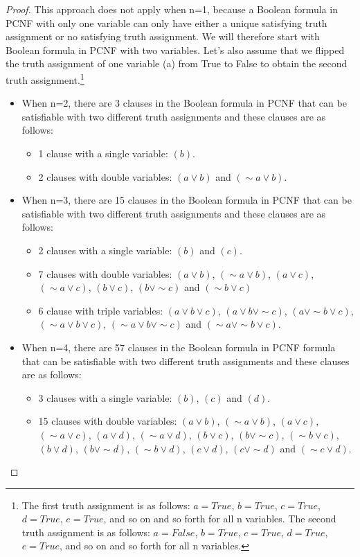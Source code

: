 \documentclass[runningheads,a4paper]{llncs}
\let\oldsim\sim
\renewcommand{\sim}{{\oldsim}}
\begin{document}
\begin{theorem}
\begin{proof}
This approach does not apply when n=1, because a Boolean formula in PCNF with only one variable can only have either a unique satisfying truth assignment or no satisfying truth assignment. We will therefore start with Boolean formula in PCNF with two variables. Let's also assume that we flipped the truth assignment of one variable (a) from True to False to obtain the second truth assignment.\footnote{The first truth assignment is as follows: $a=True$, $b=True$, $c=True$, $d=True$, $e=True$, and so on and so forth for all n variables. The second truth assignment is as follows: $a=False$, $b=True$, $c=True$, $d=True$, $e=True$, and so on and so forth for all n variables. } 
\begin{itemize}
\item When n=2, there are 3 clauses in the Boolean formula in PCNF that can be satisfiable with two different truth assignments  and these clauses are as follows:
    \begin{itemize}
    \item 1 clause with a single variable: $(b)$.
    \item 2 clauses with double variables: $({a}\vee {b})$ and $(\sim {a}\vee {b})$.
    \end{itemize}
\item When n=3, there are 15 clauses in the Boolean formula in PCNF that can be satisfiable with two different truth assignments and these clauses are as follows:
    \begin{itemize}
    \item 2 clauses with a single variable:  $(b)$ and $(c)$.
    \item 7 clauses with double variables: $({a}\vee {b})$,  $(\sim {a}\vee {b})$,  $({a}\vee {c})$, $(\sim {a}\vee {c})$,  $({b}\vee {c})$, $({b}\vee \sim {c})$ and $(\sim {b}\vee {c})$
    \item 6 clause with triple variables: $({a}\vee {b} \vee {c})$, $({a}\vee {b} \vee \sim {c})$, $({a}\vee \sim {b} \vee {c})$, $(\sim {a}\vee {b} \vee {c})$, $(\sim {a}\vee {b} \vee \sim {c})$ and $( \sim {a}\vee \sim {b} \vee {c})$.
    \end{itemize}
\item When n=4, there are 57 clauses in the Boolean formula in PCNF formula that can be satisfiable with two different truth assignments and these clauses are as follows:
    \begin{itemize}
    \item 3 clauses with a single variable:  $(b)$, $(c)$ and $(d)$.
    \item 15 clauses with double variables: $({a}\vee {b})$, $(\sim {a}\vee {b})$, $({a}\vee {c})$, $(\sim {a}\vee {c})$, $({a}\vee {d})$, $(\sim {a}\vee {d})$, $({b}\vee {c})$, $({b}\vee \sim {c})$, $(\sim {b}\vee {c})$, $({b}\vee {d})$, $({b}\vee \sim {d})$, $(\sim {b}\vee {d})$, $({c}\vee {d})$, $({c}\vee \sim {d})$ and $(\sim {c}\vee {d})$.

\end{itemize}
\end{itemize}
\end{proof}
\end{theorem}
\end{document}
